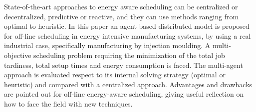 \abstract

State-of-the-art approaches to energy aware scheduling can be centralized or decentralized, predictive or reactive, and they can use methods ranging from optimal to heuristic. In this paper an agent-based distributed model is proposed for off-line scheduling in energy intensive manufacturing systems, by using a real industrial case, specifically manufacturing by injection moulding. A multi-objective scheduling problem requiring the minimization of the total job tardiness, total setup times and energy consumption is faced. The multi-agent approach is evaluated respect to its internal solving strategy (optimal or heuristic) and compared with a centralized approach. Advantages and drawbacks are pointed out for off-line energy-aware scheduling, giving useful reflection on how to face the field with new techniques.